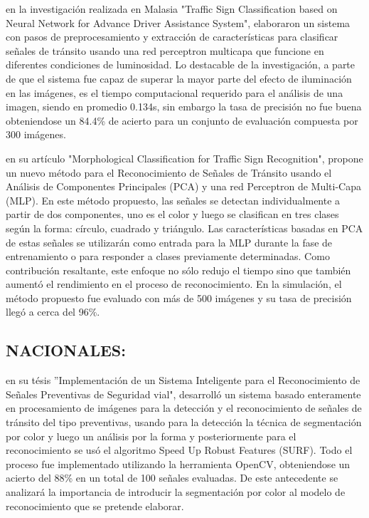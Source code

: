 		\citep{Hannan2014} en la investigación realizada en Malasia "Traffic Sign Classification based on Neural Network for Advance Driver Assistance System", elaboraron un sistema con pasos de preprocesamiento y extracción de características para clasificar señales de tránsito usando una red perceptron multicapa que funcione en diferentes condiciones de luminosidad. Lo destacable de la investigación, a parte de que el sistema fue capaz de superar la mayor parte del efecto de iluminación en las imágenes, es el tiempo computacional requerido para el análisis de una imagen, siendo en promedio 0.134s, sin embargo la tasa de precisión no fue buena obteniendose un 84.4\% de acierto para un conjunto de evaluación compuesta por 300 imágenes. 
		\vskip 0.4cm	

		\citep{Hai2014} en su artículo "Morphological Classification for Traffic Sign Recognition", propone un nuevo método para el Reconocimiento de Señales de Tránsito usando el Análisis de Componentes Principales (PCA) y una red Perceptron de Multi-Capa (MLP). En este método propuesto, las señales se detectan individualmente a partir de dos componentes, uno es el color y luego se clasifican en tres clases según la forma: círculo, cuadrado y triángulo. Las características basadas en PCA de estas señales se utilizarán como entrada para la MLP durante la fase de entrenamiento o para responder a clases previamente determinadas. Como contribución resaltante, este enfoque no sólo redujo el tiempo sino que también aumentó el rendimiento en el proceso de reconocimiento. En la simulación, el método propuesto fue evaluado con más de 500 imágenes y su tasa de precisión llegó a cerca del 96\%. 
	\newpage		
	\subsection
	{NACIONALES:}

		\citep{Vargas2015} en su tésis ”Implementación de un Sistema Inteligente para el Reconocimiento de Señales Preventivas de Seguridad vial", desarrolló un sistema basado enteramente en procesamiento de imágenes para la detección y el reconocimiento de señales de tránsito del tipo preventivas, usando para la detección la técnica de segmentación por color y luego un análisis por la forma y posteriormente para el reconocimiento se usó el algoritmo Speed Up Robust Features (SURF). Todo el proceso fue implementado utilizando la herramienta OpenCV, obteniendose un acierto del 88\% en un total de 100 señales evaluadas. De este antecedente se analizará la importancia de introducir la segmentación por color al modelo de reconocimiento que se pretende elaborar.
		\vskip 0.4cm

